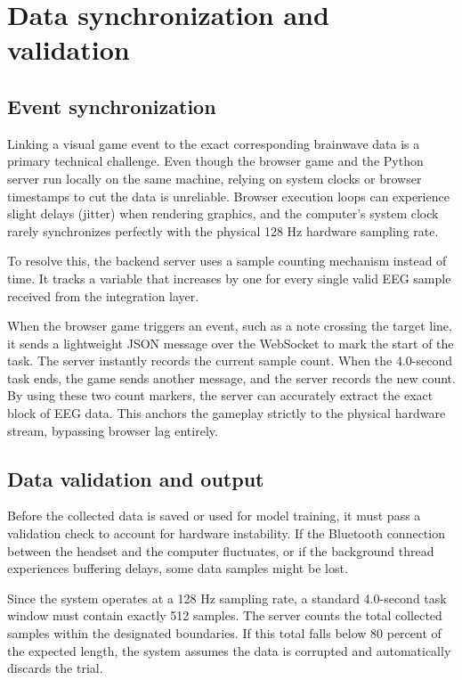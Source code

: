 \documentclass[a4paper, 11pt, openany]{report}
\begin{document}
    \section{Data synchronization and validation}

    \subsection{Event synchronization}
    
    Linking a visual game event to the exact corresponding brainwave data is a primary technical challenge. Even though the browser game and the Python server run locally on the same machine, relying on system clocks or browser timestamps to cut the data is unreliable. Browser execution loops can experience slight delays (jitter) when rendering graphics, and the computer's system clock rarely synchronizes perfectly with the physical 128 Hz hardware sampling rate.

    To resolve this, the backend server uses a sample counting mechanism instead of time. It tracks a variable that increases by one for every single valid EEG sample received from the integration layer.

    When the browser game triggers an event, such as a note crossing the target line, it sends a lightweight JSON message over the WebSocket to mark the start of the task. The server instantly records the current sample count. When the 4.0-second task ends, the game sends another message, and the server records the new count. By using these two count markers, the server can accurately extract the exact block of EEG data. This anchors the gameplay strictly to the physical hardware stream, bypassing browser lag entirely.

    \subsection{Data validation and output}
    
    Before the collected data is saved or used for model training, it must pass a validation check to account for hardware instability. If the Bluetooth connection between the headset and the computer fluctuates, or if the background thread experiences buffering delays, some data samples might be lost.

    Since the system operates at a 128 Hz sampling rate, a standard 4.0-second task window must contain exactly 512 samples. The server counts the total collected samples within the designated boundaries. If this total falls below 80 percent of the expected length, the system assumes the data is corrupted and automatically discards the trial.
\end{document}
